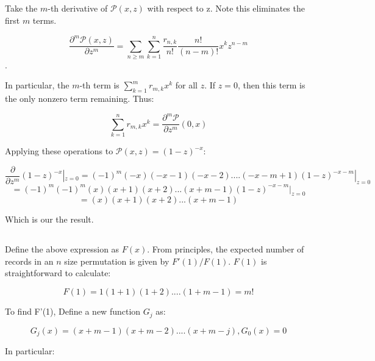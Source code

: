 \documentclass{article}
\begin{document}
\subsection{}

\subsection{}

\subsection{}

\subsection{}
Take the $m$-th derivative of $\mathcal P(x,z)$ with respect to z. Note this eliminates the first $m$ terms.

$$\frac{\partial^m \mathcal P(x,z)}{\partial z^m} = \sum_{n \ge m} \sum_{k = 1}^{n} \frac{r_{n,k}}{n!}\frac{n!}{(n-m)!}x^kz^{n-m}$$. 

In particular, the $m$-th term is $\sum_{k = 1}^{m}r_{m,k} x^k$ for all $z$. If $z = 0$, then this term is the only nonzero term remaining. Thus:

$$\sum_{k = 1}^{n}r_{m,k} x^k = \frac{\partial^m \mathcal P}{\partial z^m}(0,x) $$

Applying these operations to $\mathcal P(x,z) = (1-z)^{-x}$:

$$\frac{\partial}{\partial z^m} (1-z)^{-x}|_{z = 0} = (-1)^m(-x)(-x-1)(-x-2)....(-x - m + 1)(1-z)^{-x-m}|_{z = 0}$$
$$= (-1)^m(-1)^m(x)(x+1)(x+2)...(x + m -1)(1-z)^{-x-m}|_{z = 0}$$
$$= (x)(x+1)(x+2)...(x + m -1)$$

Which is our the result.

\subsection{}

Define the above expression as $F(x)$. From principles, the expected number of records in an $n$ size permutation is given by $F'(1)/F(1)$. $F(1)$ is straightforward to calculate:

$$F(1) = 1(1+1)(1 + 2)....(1 + m - 1) = m!$$

To find F'(1), Define a new function $G_j$ as:

$$G_j(x) = (x+m-1)(x+m-2)....(x+m-j), G_0(x) = 0$$

In particular:
\end{document}
